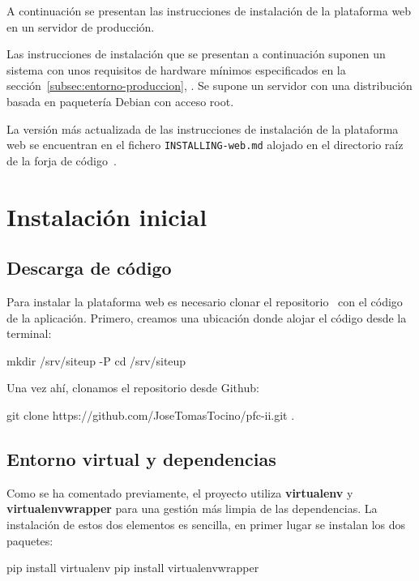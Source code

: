 A continuación se presentan las instrucciones de instalación de la plataforma
web en un servidor de producción.

Las instrucciones de instalación que se presentan a continuación suponen un
sistema con unos requisitos de hardware mínimos especificados en la
sección~\ref{subsec:entorno-produccion},
\textit{}. Se supone un servidor con una
distribución basada en paquetería Debian con acceso root.

La versión más actualizada de las instrucciones de instalación de la plataforma
web se encuentran en el fichero \texttt{INSTALLING-web.md} alojado en el
directorio raíz de la forja de código~\cite{forja}.

\section{Instalación inicial}

\subsection{Descarga de código}

Para instalar la plataforma web es necesario clonar el repositorio~\cite{forja}
con el código de la aplicación. Primero, creamos una ubicación donde alojar el
código desde la terminal:

\begin{bashcode}
mkdir /srv/siteup -P  
cd /srv/siteup
\end{bashcode}

Una vez ahí, clonamos el repositorio desde Github:

\begin{bashcode}
git clone https://github.com/JoseTomasTocino/pfc-ii.git .  
\end{bashcode}

\subsection{Entorno virtual y dependencias}

Como se ha comentado previamente, el proyecto utiliza \textbf{virtualenv} y
\textbf{virtualenvwrapper} para una gestión más limpia de las dependencias. La
instalación de estos dos elementos es sencilla, en primer lugar se instalan los
dos paquetes:

\begin{bashcode}
pip install virtualenv
pip install virtualenvwrapper
\end{bashcode}

